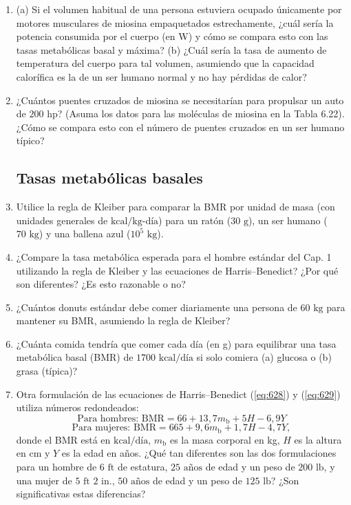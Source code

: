 \documentclass[12pt]{book}
\begin{document}
\begin{enumerate}
\item[6.45] (a) Si el volumen habitual de una persona estuviera ocupado únicamente por motores musculares de miosina empaquetados estrechamente, ¿cuál sería la potencia consumida por el cuerpo (en W) y cómo se compara esto con las tasas metabólicas basal y máxima? (b) ¿Cuál sería la tasa de aumento de temperatura del cuerpo para tal volumen, asumiendo que la capacidad calorífica es la de un ser humano normal y no hay pérdidas de calor?

\item[6.46] ¿Cuántos puentes cruzados de miosina se necesitarían para propulsar un auto de $200\text{ hp}$? (Asuma los datos para las moléculas de miosina en la Tabla 6.22). ¿Cómo se compara esto con el número de puentes cruzados en un ser humano típico?

\subsection*{Tasas metabólicas basales}

\item[6.47] Utilice la regla de Kleiber para comparar la BMR por unidad de masa (con unidades generales de $\text{kcal/kg-día}$) para un ratón ($30\text{ g}$), un ser humano ($70\text{ kg}$) y una ballena azul ($10^5\text{ kg}$).

\item[6.48] ¿Compare la tasa metabólica esperada para el hombre estándar del Cap. 1 utilizando la regla de Kleiber y las ecuaciones de Harris--Benedict? ¿Por qué son diferentes? ¿Es esto razonable o no?

\item[6.49] ¿Cuántos donuts estándar debe comer diariamente una persona de $60\text{ kg}$ para mantener su BMR, asumiendo la regla de Kleiber?

\item[6.50] ¿Cuánta comida tendría que comer cada día (en g) para equilibrar una tasa metabólica basal (BMR) de $1700\text{ kcal/día}$ si solo comiera (a) glucosa o (b) grasa (típica)?

\item[6.51] Otra formulación de las ecuaciones de Harris--Benedict (\ref{eq:628}) y (\ref{eq:629}) utiliza números redondeados:
\begin{equation}
\text{Para hombres: BMR} = 66 + 13{,}7 m_{\text{b}} + 5 H - 6{,}9 Y
\label{eq:677}
\end{equation}
\begin{equation}
\text{Para mujeres: BMR} = 665 + 9{,}6 m_{\text{b}} + 1{,}7 H - 4{,}7 Y,
\label{eq:678}
\end{equation}
donde el BMR está en $\text{kcal/día}$, $m_{\text{b}}$ es la masa corporal en kg, $H$ es la altura en cm y $Y$ es la edad en años. ¿Qué tan diferentes son las dos formulaciones para un hombre de $6\text{ ft}$ de estatura, $25\text{ años}$ de edad y un peso de $200\text{ lb}$, y una mujer de $5\text{ ft } 2\text{ in.}$, $50\text{ años}$ de edad y un peso de $125\text{ lb}$? ¿Son significativas estas diferencias?


\end{enumerate}
\end{document}
